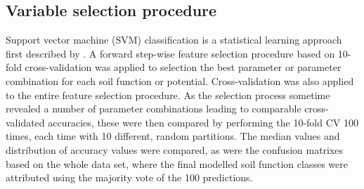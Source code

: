 \documentclass[preprint,12pt,authoryear]{elsarticle}
\begin{document}
\subsection{Variable selection procedure}
Support vector machine (SVM) classification is a statistical learning approach first described by \cite{Cortes1995}.
A forward step-wise feature selection procedure based on 10-fold cross-validation was applied to selection the best parameter or parameter combination for each soil function or potential. Cross-validation was also applied to the entire feature selection procedure. As the selection process sometime revealed a number of parameter combinations leading to comparable cross-validated accuracies, these were then compared by performing the 10-fold CV 100 times, each time with 10 different, random partitions. The median values and distribution of accuracy values were compared, as were the confusion matrixes based on the whole data set, where the final modelled soil function classes were attributed using the majority vote of the 100 predictions.
\end{document}
